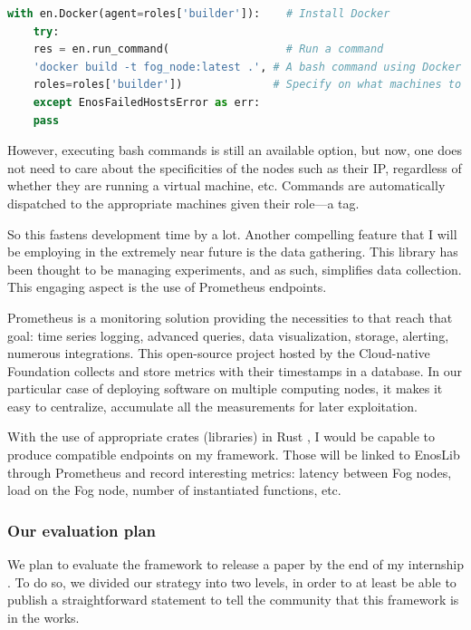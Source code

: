 \begin{lstlisting}[language=Python, caption=EnosLib context example with Docker, label=listing:dockerenos]
	with en.Docker(agent=roles['builder']):    # Install Docker
	try:
	res = en.run_command(                  # Run a command
	'docker build -t fog_node:latest .', # A bash command using Docker
	roles=roles['builder'])              # Specify on what machines to act on
	except EnosFailedHostsError as err:
	pass
\end{lstlisting}

However, executing bash commands is still an available option, but now, one does not need to care about the specificities of the nodes such as their IP, regardless of whether they are running a virtual machine, etc. Commands are automatically dispatched to the appropriate machines given their role—a tag.

So this fastens development time by a lot. Another compelling feature that I will be employing in the extremely near future is the data gathering. This library has been thought to be managing experiments, and as such, simplifies data collection. This engaging aspect is the use of Prometheus endpoints.

Prometheus \cite{prometheus_authors_prometheus_nodate} is a monitoring solution providing the necessities to that reach that goal: time series logging, advanced queries, data visualization, storage, alerting, numerous integrations. This open-source project hosted by the Cloud-native Foundation collects and store metrics with their timestamps in a database. In our particular case of deploying software on multiple computing nodes, it makes it easy to centralize, accumulate all the measurements for later exploitation.

With the use of appropriate crates (libraries) in Rust \cite{sully_rocket_prometheus_2022}, I would be capable to produce compatible endpoints on my framework. Those will be linked to EnosLib through Prometheus and record interesting metrics: latency between Fog nodes, load on the Fog node, number of instantiated functions, etc.

\subsubsection{Our evaluation plan}

We plan to evaluate the framework to release a paper by the end of my internship . To do so, we divided our strategy into two levels, in order to at least be able to publish a straightforward statement to tell the community that this framework is in the works.

